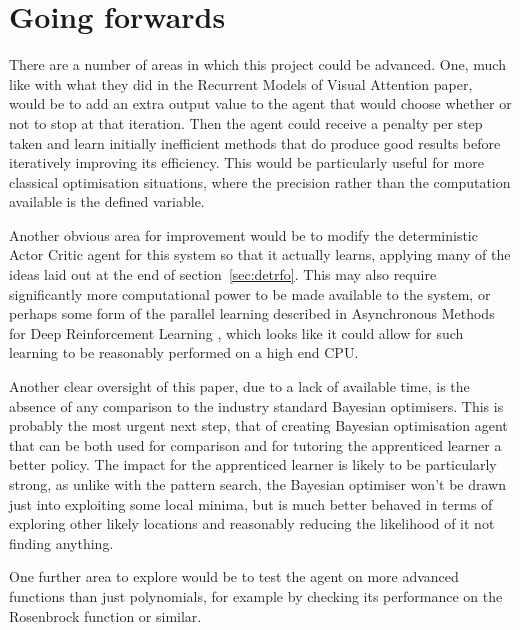 \section{Going forwards}
There are a number of areas in which this project could be advanced. One, much like with what they did in the Recurrent Models of Visual Attention paper\cite{RVA}, would be to add an extra output value to the agent that would choose whether or not to stop at that iteration. Then the agent could receive a penalty per step taken and learn initially inefficient methods that do produce good results before iteratively improving its efficiency. This would be particularly useful for more classical optimisation situations, where the precision rather than the computation available is the defined variable.

Another obvious area for improvement would be to modify the deterministic Actor Critic agent for this system so that it actually learns, applying many of the ideas laid out at the end of section~\ref{sec:detrfo}. This may also require significantly more computational power to be made available to the system, or perhaps some form of the parallel learning described in Asynchronous Methods for Deep Reinforcement Learning \cite{mnih2016asynchronous}, which looks like it could allow for such learning to be reasonably performed on a high end CPU.

Another clear oversight of this paper, due to a lack of available time, is the absence of any comparison to the industry standard Bayesian optimisers. This is probably the most urgent next step, that of creating Bayesian optimisation agent that can be both used for comparison and for tutoring the apprenticed learner a better policy. The impact for the apprenticed learner is likely to be particularly strong, as unlike with the pattern search, the Bayesian optimiser won't be drawn just into exploiting some local minima, but is much better behaved in terms of exploring other likely locations and reasonably reducing the likelihood of it not finding anything.

One further area to explore would be to test the agent on more advanced functions than just polynomials, for example by checking its performance on the Rosenbrock function or similar.